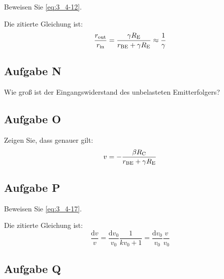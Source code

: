 \begin{problem}
	Beweisen Sie \eqref{eq:3_4-12}.
\end{problem}

Die zitierte Gleichung ist:
\begin{equation}
	\label{eq:3_4-12}
	\frac{r_\text{out}}{r_\text{in}}
	= \frac{\gamma R_\text E}{r_\text{BE} + \gamma R_\text E}
	\approx \frac 1\gamma
\end{equation}

\fehlt

\subsection{Aufgabe N}

\begin{problem}
	Wie groß ist der Eingangswiderstand des unbelasteten Emitterfolgers?
\end{problem}

\fehlt

\subsection{Aufgabe O}

\begin{problem}
	Zeigen Sie, dass genauer gilt:
	\begin{equation}
		\label{eq:3_4-14}
		v = - \frac{\beta R_\text C}{r_\text{BE} + \gamma R_\text E}
	\end{equation}
\end{problem}

\fehlt

\subsection{Aufgabe P}

\begin{problem}
	Beweisen Sie \eqref{eq:3_4-17}.
\end{problem}

Die zitierte Gleichung ist:
\begin{equation}
	\label{eq:3_4-17}
	\frac{\mathrm d v} v
	= \frac{\mathrm d v_0}{v_0} \frac{1}{k v_0 + 1}
	= \frac{\mathrm d v_0}{v_0} \frac{v}{v_0}
\end{equation}

\fehlt

\subsection{Aufgabe Q}

